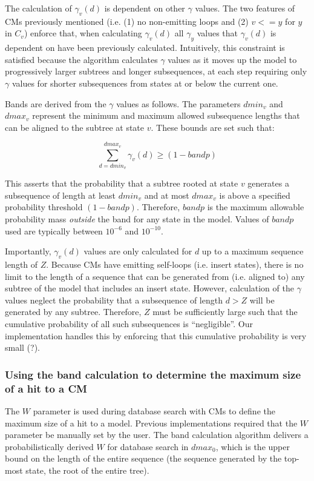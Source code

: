 \documentclass[11pt]{article}
\begin{document}
The calculation of $\gamma_v(d)$ is dependent on other $\gamma$
values. The two features of CMs previously mentioned (i.e. (1) no
non-emitting loops and (2) $v <= y$ for $y$ in $C_v$) enforce
that, when calculating $\gamma_v(d)$ all $\gamma_y$ values that
$\gamma_v(d)$ is dependent on have been previously calculated. 
Intuitively, this constraint is satisfied because the algorithm
calculates $\gamma$ values as it moves up the model to progressively
larger subtrees and longer subsequences, at each step requiring only
$\gamma$ values for shorter subsequences from states at or below the
current one. 

Bands are derived from the $\gamma$ values as follows.
The parameters $dmin_v$ and $dmax_v$ represent the minimum and maximum
allowed subsequence lengths that can be aligned to the subtree
at state $v$. These bounds are set such that: 

\[
\sum_{d = dmin_v}^{dmax_v} \gamma_v(d) \geq (1-bandp)
\]

This asserts that the probability that a subtree
rooted at state $v$ generates a subsequence of length at least
$dmin_v$ and at most $dmax_v$ is above a specified probability
threshold $(1-bandp)$. Therefore, $bandp$ is the maximum allowable
probability mass \emph{outside} the band for any state in the
model. Values of $bandp$ used are typically between $10^{-6}$ and
$10^{-10}$. 

Importantly, $\gamma_v(d)$ values are only calculated for $d$ up to a
maximum sequence length of $Z$. Because CMs have emitting self-loops
(i.e. insert states), there is no limit to the length of a sequence
that can be generated from (i.e. aligned to) any subtree of the model
that includes an insert state. However, calculation of the
$\gamma$ values neglect the probability that a subsequence
of length $d > Z$ will be generated by any subtree.
Therefore, $Z$ must be sufficiently large such that the cumulative
probability of all such subsequences is ``negligible''. Our
implementation handles this by enforcing that this cumulative
probability is very small (?).

\subsubsection{Using the band calculation to determine the maximum
  size of a hit to a CM}
The $W$ parameter is used during database search with CMs to
define the maximum size of a hit to a model. Previous implementations
required that the $W$ parameter be manually set by the user. 
The band calculation algorithm delivers a probabilistically derived
$W$ for database search in $dmax_0$, which is the upper bound on the
length of the entire sequence (the sequence generated by the top-most
state, the root of the entire tree). 
\end{document}
